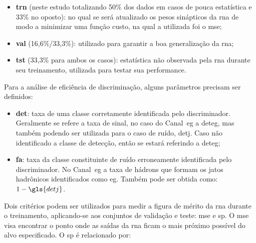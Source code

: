 

\begin{itemize} 
\item \textbf{\gls{trn}} (neste estudo totalizando 50\% dos dados em
casos de pouca estatística e 33\% no oposto): 
no qual se será atualizado os pesos sinápticos da \gls{rna} de modo a minimizar uma função 
custo, na qual a utilizada foi o \gls{mse};
\item \textbf{\gls{val}} (16,6\%/33,3\%): utilizado para garantir a boa 
generalização da \gls{rna}; 
\item \textbf{\gls{tst}} (33,3\% para ambos os casos): 
estatística não observada pela \gls{rna} durante seu treinamento, utilizada para 
testar sua performance. 
\end{itemize}

Para a análise de eficiência de discriminação, alguns parâmetros precisam ser definidos:

\begin{itemize}
\item \textbf{\gls{det}}: taxa de uma classe corretamente identificada pelo
discriminador. Geralmente se refere a taxa de sinal, no caso do Canal~\gls{eg} a
\gls{deteg}, mas também podendo ser utilizada para o caso de ruído, \gls{detj}.
Caso não identificado a classe de detecção, então se estará referindo a
\gls{deteg};
\item \textbf{\gls{fa}}: taxa da classe constituinte de ruído erroneamente
identificada pelo discriminador. No Canal~\gls{eg} a taxa de hádrons que formam os
jatos hadrônicos identificados como \gls{eg}. Também pode
ser obtida como: $1-\gls{detj}$.
\end{itemize}


Dois critérios podem ser utilizados para medir a figura de mérito da \gls{rna}
durante o treinamento, aplicando-se aos conjuntos de validação e teste: \gls{mse} 
e \gls{sp}. O \gls{mse} visa encontrar o ponto onde as saídas da \gls{rna} ficam
o mais próximo possível do alvo especificado. O \gls{sp} é relacionado por:

